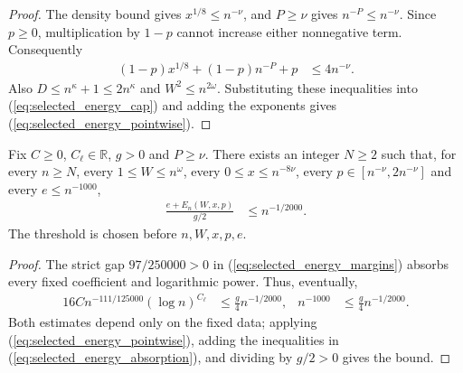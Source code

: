 \begin{proof}
    \leanok
    The density bound gives $x^{1/8}\leq n^{-\nu}$, and
    $P\geq\nu$ gives $n^{-P}\leq n^{-\nu}$. Since $p\geq0$,
    multiplication by $1-p$ cannot increase either nonnegative term.
    Consequently
    \begin{align}
        (1-p)x^{1/8}+(1-p)n^{-P}+p & \leq4n^{-\nu}.
        \label{eq:selected_energy_bracket}
    \end{align}
    Also $D\leq n^\kappa+1\leq2n^\kappa$ and
    $W^2\leq n^{2\omega}$. Substituting these inequalities into
    (\ref{eq:selected_energy_cap}) and adding the exponents gives
    (\ref{eq:selected_energy_pointwise}).
\end{proof}

\begin{lemma}
    \label{thm:arealaw-selected-energy-decay}
    \leanok
    Fix $C\geq0$, $C_\ell\in\mathbb R$, $g>0$ and $P\geq\nu$.
    There exists an integer $N\geq2$ such that, for every $n\geq N$,
    every $1\leq W\leq n^\omega$, every $0\leq x\leq n^{-8\nu}$,
    every $p\in[n^{-\nu},2n^{-\nu}]$ and every $e\leq n^{-1000}$,
    \begin{align}
        \frac{e+E_n(W,x,p)}{g/2} & \leq n^{-1/2000}.
        \label{eq:selected_energy_decay}
    \end{align}
    The threshold is chosen before $n,W,x,p,e$.
\end{lemma}

\begin{proof}
    \leanok
    The strict gap $97/250000>0$ in
    (\ref{eq:selected_energy_margins}) absorbs every fixed coefficient
    and logarithmic power. Thus, eventually,
    \begin{align}
        16C n^{-111/125000}(\log n)^{C_\ell}
                  & \leq\frac g4 n^{-1/2000}, &
        n^{-1000} & \leq\frac g4 n^{-1/2000}.
        \label{eq:selected_energy_absorption}
    \end{align}
    Both estimates depend only on the fixed data; applying
    (\ref{eq:selected_energy_pointwise}), adding the inequalities in
    (\ref{eq:selected_energy_absorption}), and dividing by $g/2>0$ gives the bound.
\end{proof}

